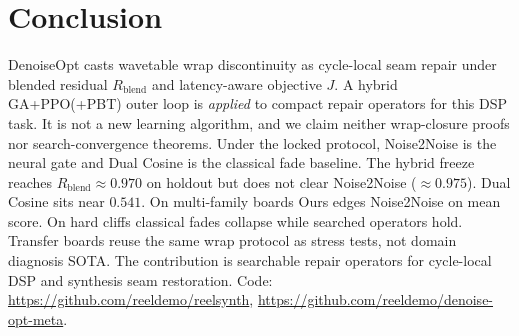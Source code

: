 \section{Conclusion}
\label{sec:conclusion}

DenoiseOpt casts wavetable wrap discontinuity as cycle-local seam repair under blended residual $R_{\mathrm{blend}}$ and latency-aware objective $J$.
A hybrid GA+PPO(+PBT) outer loop is \emph{applied} to compact repair operators for this DSP task.
It is not a new learning algorithm, and we claim neither wrap-closure proofs nor search-convergence theorems.
Under the locked protocol, Noise2Noise is the neural gate and Dual Cosine is the classical fade baseline.
The hybrid freeze reaches $R_{\mathrm{blend}}{\approx}0.970$ on holdout but does not clear Noise2Noise (${\approx}0.975$).
Dual Cosine sits near $0.541$.
On multi-family boards Ours edges Noise2Noise on mean score.
On hard cliffs classical fades collapse while searched operators hold.
Transfer boards reuse the same wrap protocol as stress tests, not domain diagnosis SOTA.
The contribution is searchable repair operators for cycle-local DSP and synthesis seam restoration.
Code: \url{https://github.com/reeldemo/reelsynth}, \url{https://github.com/reeldemo/denoise-opt-meta}.
